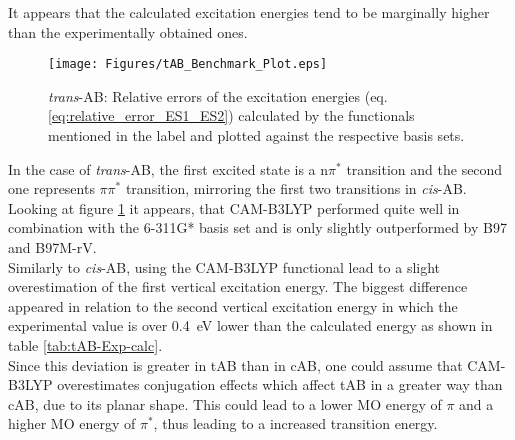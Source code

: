 %
It appears that the calculated excitation energies tend to be marginally higher than the experimentally obtained ones.
%
\begin{comment}
\begin{table}[H]
\caption{cAB}
\centering
\begin{tabular}{llll}
\toprule
State & Excitation energy (eV) & Oscillator strength  & Exp. Value (eV) \\ 
\midrule
S1    & 2.877                  & 0.03                & \\
S2    & \textbf{4.836}         & \textbf{0.14}       & \\
S3    & 4.973                  & 0.02                & \\
S4    & 5.109                  & 0.08                & \\
S5    & 5.152                  & \SI{1.58e-5}{}      & \\
S6    & \textbf{5.638}         & \textbf{0.16}       & \\ 
\bottomrule
\end{tabular}
\end{table}
\end{comment}
%
%
\begin{figure}[H]
    \centering
    \texttt{[image: Figures/tAB\_Benchmark\_Plot.eps]}
    \caption{\textit{trans}-AB: Relative errors of the excitation energies (eq. \ref{eq:relative_error_ES1_ES2}) calculated by the functionals mentioned in the label and plotted against the respective basis sets.}
    \label{fig:tAB_Benchmark}
\end{figure}
%
In the case of \textit{trans}-AB, the first excited state is a $\text{n}\pi^{*}$ transition and the second one represents $\pi\pi^{*}$ transition, mirroring the first two transitions in \textit{cis}-AB. Looking at figure \ref{fig:tAB_Benchmark} it appears, that CAM-B3LYP performed quite well in combination with the 6-311G* basis set and is only slightly outperformed by B97 and B97M-rV. \\
Similarly to \textit{cis}-AB, using the CAM-B3LYP functional lead to a slight overestimation of the first vertical excitation energy. The biggest difference appeared in relation to the second vertical excitation energy in which the experimental value is over \SI{0.4}{\eV} lower than the calculated energy as shown in table \ref{tab:tAB-Exp-calc}. \\ Since this deviation is greater in tAB than in cAB, one could assume that CAM-B3LYP overestimates conjugation effects which affect tAB in a greater way than cAB, due to its planar shape. This could lead to a lower MO energy of $\pi$ and a higher MO energy of $\pi^{*}$, thus leading to a increased transition energy.
